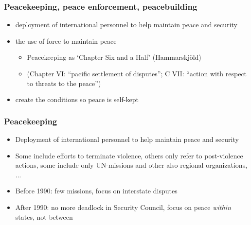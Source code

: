 \documentclass[aspectratio=43]{beamer}
\begin{document}
\begin{frame}
\frametitle{Peacekeeping, peace enforcement, peacebuilding}
\centering

\begin{itemize}[<+->]
  \item \textbf{{\color{red}{Peacekeeping:}}} deployment of international personnel to help maintain peace and security
  \item \textbf{{\color{red}{Peace enforcement:}}} the use of force to maintain peace
  \begin{itemize}
    \item Peacekeeping as `Chapter Six and a Half' (Hammarskjöld)
    \item (Chapter VI: ``pacific settlement of disputes''; C VII: ``action with respect to threats to the peace'')
  \end{itemize}
  \item \textbf{{\color{red}{Peacebuilding:}}} create the conditions so peace is self-kept
\end{itemize}

\end{frame}

\begin{frame}
\frametitle{Peacekeeping}
\centering

  \begin{itemize}[<+->]
    \item Deployment of international personnel to help maintain peace and security
    \item Some include efforts to terminate violence, others only refer to post-violence actions, some include only UN-missions and other also regional organizations, ...
    \item Before 1990: few missions, focus on interstate disputes
    \item After 1990: no more deadlock in Security Council, focus on peace \textit{within} states, not between
  \end{itemize}

\end{frame}
\end{document}
